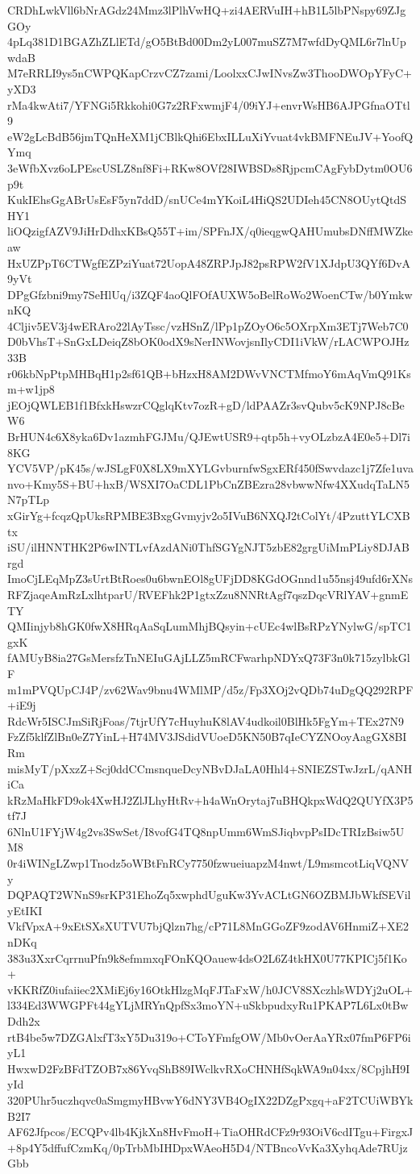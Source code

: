 CRDhLwkVll6bNrAGdz24Mmz3lPlhVwHQ+zi4AERVuIH+hB1L5lbPNspy69ZJgGOy
4pLq381D1BGAZhZLlETd/gO5BtBd00Dm2yL007muSZ7M7wfdDyQML6r7lnUpwdaB
M7eRRLI9ys5nCWPQKapCrzvCZ7zami/LoolxxCJwINvsZw3ThooDWOpYFyC+yXD3
rMa4kwAti7/YFNGi5Rkkohi0G7z2RFxwmjF4/09iYJ+envrWsHB6AJPGfnaOTtl9
eW2gLcBdB56jmTQnHeXM1jCBlkQhi6EbxILLuXiYvuat4vkBMFNEuJV+YoofQYmq
3eWfbXvz6oLPEscUSLZ8nf8Fi+RKw8OVf28IWBSDs8RjpcmCAgFybDytm0OU6p9t
KukIEhsGgABrUsEsF5yn7ddD/snUCe4mYKoiL4HiQS2UDIeh45CN8OUytQtdSHY1
liOQzigfAZV9JiHrDdhxKBsQ55T+im/SPFnJX/q0ieqgwQAHUmubsDNffMWZkeaw
HxUZPpT6CTWgfEZPziYuat72UopA48ZRPJpJ82psRPW2fV1XJdpU3QYf6DvA9yVt
DPgGfzbni9my7SeHlUq/i3ZQF4aoQlFOfAUXW5oBelRoWo2WoenCTw/b0YmkwnKQ
4Cljiv5EV3j4wERAro22lAyTssc/vzHSnZ/lPp1pZOyO6c5OXrpXm3ETj7Web7C0
D0bVhsT+SnGxLDeiqZ8bOK0odX9sNerINWovjsnIlyCDI1iVkW/rLACWPOJHz33B
r06kbNpPtpMHBqH1p2sf61QB+bHzxH8AM2DWvVNCTMfmoY6mAqVmQ91Ksm+w1jp8
jEOjQWLEB1f1BfxkHswzrCQglqKtv7ozR+gD/ldPAAZr3svQubv5cK9NPJ8cBeW6
BrHUN4c6X8yka6Dv1azmhFGJMu/QJEwtUSR9+qtp5h+vyOLzbzA4E0e5+Dl7i8KG
YCV5VP/pK45s/wJSLgF0X8LX9mXYLGvburnfwSgxERf450fSwvdazc1j7Zfe1uva
nvo+Kmy5S+BU+hxB/WSXI7OaCDL1PbCnZBEzra28vbwwNfw4XXudqTaLN5N7pTLp
xGirYg+fcqzQpUksRPMBE3BxgGvmyjv2o5IVuB6NXQJ2tColYt/4PzuttYLCXBtx
iSU/ilHNNTHK2P6wINTLvfAzdANi0ThfSGYgNJT5zbE82grgUiMmPLiy8DJABrgd
ImoCjLEqMpZ3sUrtBtRoes0u6bwnEOl8gUFjDD8KGdOGnnd1u55nsj49ufd6rXNs
RFZjaqeAmRzLxlhtparU/RVEFhk2P1gtxZzu8NNRtAgf7qszDqcVRlYAV+gnmETY
QMIinjyb8hGK0fwX8HRqAaSqLumMhjBQsyin+cUEc4wlBsRPzYNylwG/spTC1gxK
fAMUyB8ia27GsMersfzTnNEIuGAjLLZ5mRCFwarhpNDYxQ73F3n0k715zylbkGlF
m1mPVQUpCJ4P/zv62Wav9bnu4WMlMP/d5z/Fp3XOj2vQDb74uDgQQ292RPF+iE9j
RdcWr5ISCJmSiRjFoas/7tjrUfY7cHuyhuK8lAV4udkoil0BlHk5FgYm+TEx27N9
FzZf5klfZlBn0eZ7YinL+H74MV3JSdidVUoeD5KN50B7qIeCYZNOoyAagGX8BIRm
misMyT/pXxzZ+Scj0ddCCmsnqueDcyNBvDJaLA0Hhl4+SNIEZSTwJzrL/qANHiCa
kRzMaHkFD9ok4XwHJ2ZlJLhyHtRv+h4aWnOrytaj7uBHQkpxWdQ2QUYfX3P5tf7J
6NlnU1FYjW4g2vs3SwSet/I8vofG4TQ8npUmm6WmSJiqbvpPsIDcTRIzBsiw5UM8
0r4iWINgLZwp1Tnodz5oWBtFnRCy7750fzwueiuapzM4nwt/L9msmcotLiqVQNVy
DQPAQT2WNnS9srKP31EhoZq5xwphdUguKw3YvACLtGN6OZBMJbWkfSEVilyEtIKI
VkfVpxA+9xEtSXsXUTVU7bjQlzn7hg/cP71L8MnGGoZF9zodAV6HnmiZ+XE2nDKq
383u3XxrCqrrnuPfn9k8efmmxqFOnKQOauew4dsO2L6Z4tkHX0U77KPICj5f1Ko+
vKKRfZ0iufaiiec2XMiEj6y16OtkHlzgMqFJTaFxW/h0JCV8SXczhlsWDYj2uOL+
l334Ed3WWGPFt44gYLjMRYnQpfSx3moYN+uSkbpudxyRu1PKAP7L6Lx0tBwDdh2x
rtB4be5w7DZGAlxfT3xY5Du319o+CToYFmfgOW/Mb0vOerAaYRx07fmP6FP6iyL1
HwxwD2FzBFdTZOB7x86YvqShB89IWclkvRXoCHNHfSqkWA9n04xx/8CpjhH9IyId
320PUhr5uczhqvc0aSmgmyHBvwY6dNY3VB4OgIX22DZgPxgq+aF2TCUiWBYkB2I7
AF62Jfpcos/ECQPv4lb4KjkXn8HvFmoH+TiaOHRdCFz9r93OiV6cdITgu+FirgxJ
+8p4Y5dffufCzmKq/0pTrbMbIHDpxWAeoH5D4/NTBncoVvKa3XyhqAde7RUjzGbb
